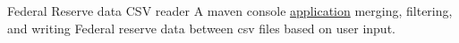 {Federal Reserve data CSV reader}
{}
{A maven console \href{https://github.com/jacobarchambault/codeloujava}{application} merging, filtering, and writing Federal reserve data between csv files based on user input.}

